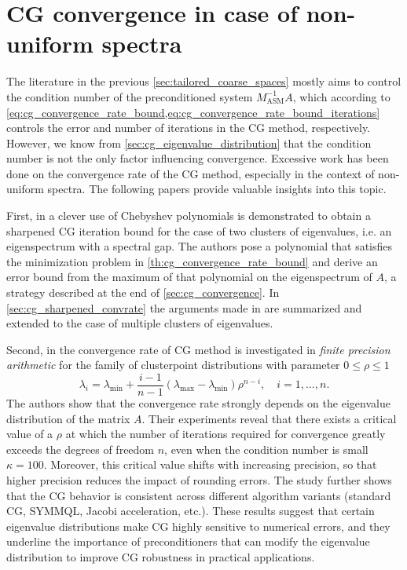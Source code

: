 \section{CG convergence in case of non-uniform spectra}\label{sec:cg_nonuniform_spectra}
The literature in the previous \cref{sec:tailored_coarse_spaces} mostly aims to control the condition number of the preconditioned system $M_{\text{ASM}}^{-1}A$, which according to \cref{eq:cg_convergence_rate_bound,eq:cg_convergence_rate_bound_iterations} controls the error and number of iterations in the CG method, respectively. However, we know from \cref{sec:cg_eigenvalue_distribution} that the condition number is not the only factor influencing convergence. Excessive work has been done on the convergence rate of the CG method, especially in the context of non-uniform spectra. The following papers provide valuable insights into this topic.

First, in \cite{cg_sharpened_convrate_Axelsson1976} a clever use of Chebyshev polynomials is demonstrated to obtain a sharpened CG iteration bound for the case of two clusters of eigenvalues, i.e. an eigenspectrum with a spectral gap. The authors pose a polynomial that satisfies the minimization problem in \cref{th:cg_convergence_rate_bound} and derive an error bound from the maximum of that polynomial on the eigenspectrum of $A$, a strategy described at the end of \cref{sec:cg_convergence}. In \cref{sec:cg_sharpened_convrate} the arguments made in \cite{cg_sharpened_convrate_Axelsson1976} are summarized and extended to the case of multiple clusters of eigenvalues.

Second, in \cite{cg_convrate_Strakos1991} the convergence rate of CG method is investigated in \textit{finite precision arithmetic} for the family of clusterpoint distributions with parameter $0 \leq \rho \leq 1$
\[
    \lambda_i = \lambda_{\text{min}} + \frac{i-1}{n-1}(\lambda_{\text{max}} - \lambda_{\text{min}})\rho^{n-i}, \quad i=1,\ldots,n.
\]
The authors show that the convergence rate strongly depends on the eigenvalue distribution of the matrix $A$. Their experiments reveal that there exists a critical value of a $\rho$ at which the number of iterations required for convergence greatly exceeds the degrees of freedom $n$, even when the condition number is small $\kappa=100$. Moreover, this critical value shifts with increasing precision, so that higher precision reduces the impact of rounding errors. The study further shows that the CG behavior is consistent across different algorithm variants (standard CG, SYMMQL, Jacobi acceleration, etc.). These results suggest that certain eigenvalue distributions make CG highly sensitive to numerical errors, and they underline the importance of preconditioners that can modify the eigenvalue distribution to improve CG robustness in practical applications.

